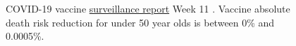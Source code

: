 \documentclass[11pt,a4paper,notitlepage]{report}
\begin{document}

\begin{figure}[h]
    \centering
    \caption{COVID-19 vaccine \href{https://assets.publishing.service.gov.uk/government/uploads/system/uploads/attachment_data/file/1061532/Vaccine_surveillance_report_-_week_11.pdf}{surveillance report} Week 11 \cite{ukhsa17032022}. Vaccine absolute death risk reduction for under 50 year olds is between 0\% and 0.0005\%.}
    \label{fig:UK-report-w11}
\end{figure}










 
 
\end{document}
